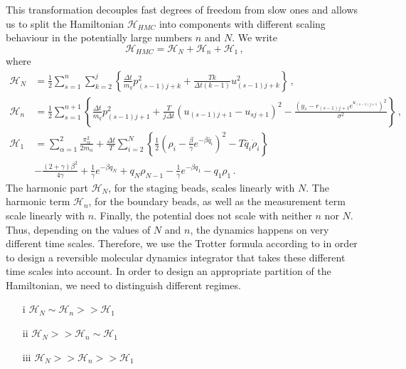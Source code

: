 \documentclass[11pt, a4paper]{article}
\newcommand{\bt}{\pmb\theta}
\begin{document}
%
%
%
This transformation decouples fast degrees of freedom from slow ones and allows us to split the Hamiltonian $\mathcal H_{HMC}$ into components with different scaling behaviour in the potentially large numbers $n$ and $N$.
We write
\begin{equation}
  \mathcal H_{HMC}= \mathcal H_N+\mathcal H_n+\mathcal H_1\,,
\end{equation}
where
\begin{align}
  \mathcal H_N
  &=
  \frac{1}{2}
  \sum_{s=1}^{n}
  \sum_{k=2}^j
  \left\{
    \frac{\Delta t}{m_q}p_{(s-1)j+k}^2
    +
    \frac{Tk}{\Delta t(k-1)}
    u_{(s-1)j+k}^2
  \right\}\,,\label{H_N}
  \\
  \mathcal H_n
  &=
  \frac{1}{2}
  \sum_{s=1}^{n+1}
  \left\{
   \frac{\Delta t }{m_q}p_{(s-1)j+1}^2
    +
    \frac{T}{j\Delta t}
    (u_{(s-1)j+1} - u_{sj+1})^2
    -
    \frac
    {(y_s-r_{(s-1)j+1}e^{u_{(s-1)j+1}})^2}
    {\sigma^2}
   \right\}\,,\\
  \mathcal H_1
  &=
   \sum_{\alpha=1}^2\frac{\pi_\alpha^2}{2m_\alpha}
   +
  \frac{\Delta t}{T}
   \sum_{i=2}^{N}
   \left\{
       \frac{1}{2}
        \left(
            \rho_i-\frac{\beta}{\gamma}e^{-\beta \bar q_i}
        \right)^2
        -
        T\bar q_i\dot\rho_i
   \right\}
  \\
  &-
  \frac{(2+\gamma)\beta^2}{4\gamma}
  +
  \frac{1}{\gamma}
  e^{-\beta q_N}
  +
  q_N \rho_{N-1}
  -
  \frac{1}{\gamma}
  e^{-\beta q_1}
  -
  q_1 \rho_{1}
\,.
\end{align}
The harmonic part $\mathcal H_N$, for the staging beads, scales linearly with $N$.
The harmonic term $\mathcal H_n$, for the boundary beads, as well as the measurement term scale linearly with $n$.
Finally, the potential does not scale with neither $n$ nor $N$.
Thus, depending on the values of $N$ and $n$, the dynamics happens on very different time scales.
Therefore, we use the Trotter formula according to \cite{tuckerman1992reversible} in order to design a reversible molecular dynamics integrator that takes these different time scales into account.
In order to design an appropriate partition of the Hamiltonian, we need to distinguish different regimes.
\begin{enumerate}
  \item[i]
  $\mathcal H_N \sim \mathcal H_n >> \mathcal H_1$
  \item[ii]
  $\mathcal H_N >> \mathcal H_n \sim \mathcal H_1$
  \item[iii]
  $\mathcal H_N >> \mathcal H_n >> \mathcal H_1$
\end{enumerate}
\end{document}
